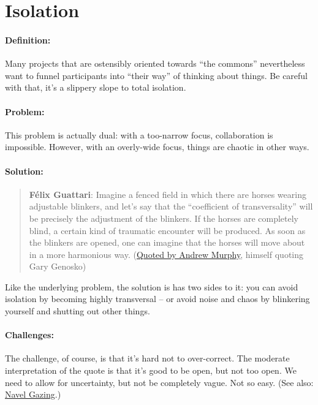 \section{Isolation}
\paragraph{Definition:} Many projects that are ostensibly oriented towards
``the commons'' nevertheless want to funnel participants into ``their
way'' of thinking about things. Be careful with that, it's a slippery
slope to total isolation.

\paragraph{Problem:} This problem is actually dual: with a too-narrow
focus, collaboration is impossible. However, with an overly-wide focus,
things are chaotic in other ways.

\paragraph{Solution:}

\begin{quote}
\textbf{Félix Guattari}: Imagine a fenced field in which there are
horses wearing adjustable blinkers, and let's say that the ``coefficient
of transversality'' will be precisely the adjustment of the blinkers. If
the horses are completely blind, a certain kind of traumatic encounter
will be produced. As soon as the blinkers are opened, one can imagine
that the horses will move about in a more harmonious way.
(\href{http://nine.fibreculturejournal.org/}{Quoted by Andrew Murphy},
himself quoting Gary Genosko)
\end{quote}


Like the underlying problem, the solution is has two sides to it: you can avoid
isolation by becoming highly transversal -- or avoid noise and chaos by
blinkering yourself and shutting out other things.  

\paragraph{Challenges:} The challenge, of course, is that it's hard not to over-correct.  The moderate interpretation of the quote is
that it's good to be open, but not too open.  We need to allow for
uncertainty, but not be completely vague.  Not so easy. (See
also: \href{http://peeragogy.org/antipatterns/navel-gazing/}{Navel
Gazing}.)

